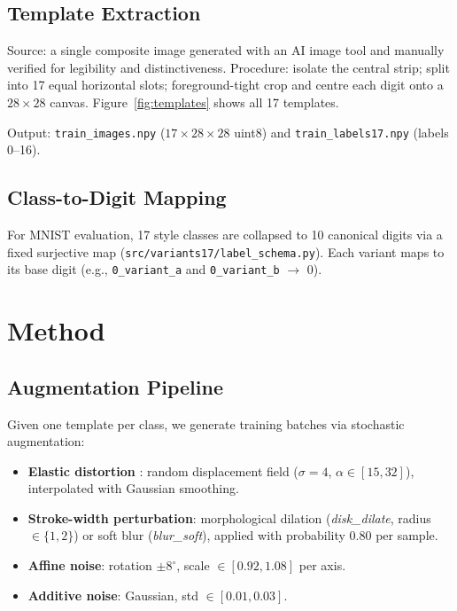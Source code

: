 \documentclass[final,5p,times,twocolumn]{elsarticle}
\begin{document}
\subsection{Template Extraction}

Source: a single composite image generated with an AI image tool and manually verified
for legibility and distinctiveness.
Procedure: isolate the central strip; split into 17 equal horizontal slots;
foreground-tight crop and centre each digit onto a $28\times28$ canvas.
Figure~\ref{fig:templates} shows all 17 templates.

Output: \texttt{train\_images.npy} ($17\times28\times28$ uint8) and
\texttt{train\_labels17.npy} (labels 0--16).

\subsection{Class-to-Digit Mapping}

For MNIST evaluation, 17 style classes are collapsed to 10 canonical digits via a fixed
surjective map (\texttt{src/variants17/label\_schema.py}).
Each variant maps to its base digit (e.g., \texttt{0\_variant\_a} and
\texttt{0\_variant\_b} $\to$ 0).

\section{Method}

\subsection{Augmentation Pipeline}

Given one template per class, we generate training batches via stochastic augmentation:

\begin{itemize}
  \item \textbf{Elastic distortion} \cite{Simard2003}: random displacement field
        ($\sigma\!=\!4$, $\alpha\!\in\![15,32]$), interpolated with Gaussian smoothing.
  \item \textbf{Stroke-width perturbation}: morphological dilation (\textit{disk\_dilate},
        radius $\in\{1,2\}$) or soft blur (\textit{blur\_soft}), applied with probability
        0.80 per sample.
  \item \textbf{Affine noise}: rotation $\pm8^\circ$, scale $\in[0.92, 1.08]$ per axis.
  \item \textbf{Additive noise}: Gaussian, std $\in[0.01, 0.03]$.
\end{itemize}
\end{document}
